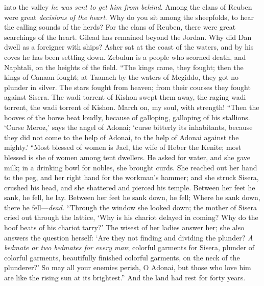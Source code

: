 \begin{biblechapter}
into the valley \textit{he was sent to get him from behind}. 
Among the clans of Reuben 
were great \textit{decisions of the heart}.
\verse Why do you sit among the sheepfolds, 
to hear the calling sounds of the herds? 
For the clans of Reuben, 
there were great searchings of the heart.
\verse Gilead has remained beyond the Jordan. 
Why did Dan dwell as a foreigner with ships? 
Asher sat at the coast of the waters, 
and by his coves he has been settling down.
\verse Zebulun is a people who scorned death, 
and Naphtali, on the heights of the field.
\verse “The kings came, they fought; 
then the kings of Canaan fought; 
at Taanach by the waters of Megiddo, 
they got no plunder in silver.
\verse The stars fought from heaven; 
from their courses they fought against Sisera.
\verse The wadi torrent of Kishon swept them away, 
the raging wadi torrent, 
the wadi torrent of Kishon. 
March on, my soul, with strength!
\verse “Then the hooves of the horse beat loudly, 
because of galloping, galloping of his stallions.
\verse ‘Curse Meroz,’ says the angel of Adonai; 
‘curse bitterly its inhabitants, 
because they did not come to the help of Adonai, 
to the help of Adonai against the mighty.’
\verse “Most blessed of women is Jael, 
the wife of Heber the Kenite; 
most blessed is she of women among tent dwellers.
\verse He asked for water, and she gave milk; 
in a drinking bowl for nobles, she brought curds.
\verse She reached out her hand to the peg, 
and her right hand for the workman’s hammer; 
and she struck Sisera, crushed his head, 
and she shattered and pierced his temple.
\verse Between her feet he sank, he fell, he lay. 
Between her feet he sank down, he fell; 
Where he sank down, there he fell—\textit{dead}.
\verse “Through the window she looked down; 
the mother of Sisera cried out through the lattice, 
‘Why is his chariot delayed in coming? 
Why do the hoof beats of his chariot tarry?’
\verse The wisest of her ladies answer her; 
she also answers the question herself:
\verse ‘Are they not finding and dividing the plunder? 
\textit{A bedmate or two bedmates for every man}; 
colorful garments for Sisera, 
plunder of colorful garments, 
beautifully finished colorful garments, 
on the neck of the plunderer?’
\verse So may all your enemies perish, O Adonai, 
but those who love him are like the rising sun at its brightest.” And the land had rest for forty years.
\end{biblechapter}

